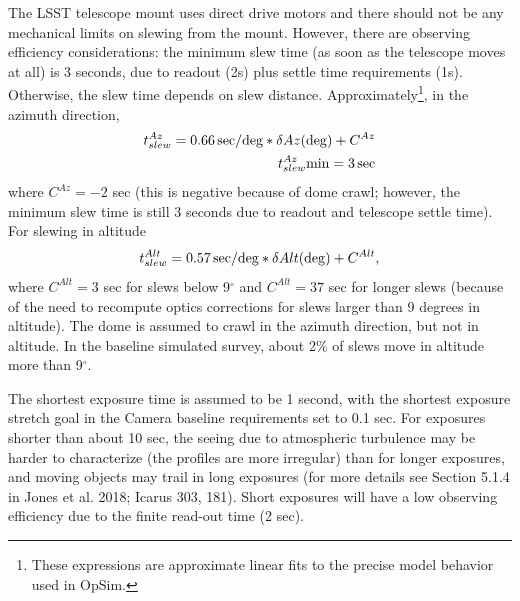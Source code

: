 \documentclass[DM,lsstdraft,toc,usenatbib]{lsstdoc}
\begin{document}
The LSST telescope mount uses direct drive motors and there should not be any mechanical limits 
on slewing from the mount.  However, there are observing efficiency considerations: the minimum
slew time (as soon as the telescope moves at all) is 3 seconds, due to readout (2s) plus settle time requirements (1s). 
Otherwise, the slew time depends on slew distance. Approximately\footnote{These expressions are 
approximate linear fits to the precise model behavior used in OpSim.}, 
in the azimuth direction, 
\begin{eqnarray}
             t_{slew}^{Az} = 0.66 \, {\rm sec/deg} * \delta Az ({\rm deg}) + C^{Az} \\
             t_{slew}^{Az} {\rm min} = 3\, {\rm sec}
\end{eqnarray} 
where $C^{Az} = -2$ sec (this is negative because of dome crawl; however, the minimum
slew time is still 3 seconds due to readout and telescope settle time). For slewing in altitude
\begin{equation}
             t_{slew}^{Alt} = 0.57 \, {\rm sec/deg} * \delta Alt ({\rm deg}) + C^{Alt} ,  
\end{equation} 
where $C^{Alt} = 3$ sec for slews below 9$^\circ$ and $C^{Alt} = 37$ sec for longer slews (because 
of the need to recompute optics corrections for slews larger than 9 degrees in altitude). 
The dome is assumed to crawl in the azimuth direction, but not in altitude. 
In the baseline simulated survey, about 2\% of slews move
in altitude more than 9$^\circ$. 

The shortest exposure time is assumed to be 1 second, with the shortest exposure stretch goal in the Camera 
baseline requirements set to 0.1 sec. For exposures shorter than 
about 10 sec, the seeing due to atmospheric turbulence may be harder to characterize (the profiles are more
irregular) than for longer exposures, and moving objects may trail in long exposures (for more
details see Section 5.1.4 in Jones et al. 2018; Icarus 303, 181). Short exposures will have a low
observing efficiency due to the finite read-out time (2 sec). %
\end{document}
